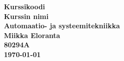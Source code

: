 \documentclass[a4paper,finnish,12pt]{article}
\begin{document}
\thispagestyle{empty}

\begin{titlepage}
    \centering
    \vspace*{11\baselineskip}
    \huge
    \bfseries
    Kurssikoodi \\
    Kurssin nimi \\
    [1.5\baselineskip]
    \normalfont
    \vfill
    \small
    Automaatio- ja systeemitekniikka \\
    \vfill
    Miikka Eloranta \\
    80294A \\[2\baselineskip]
    \textbf{\today} \\[2\baselineskip]
    \vfill


\end{titlepage}

\pagebreak

\tableofcontents

\pagebreak

\end{document}
